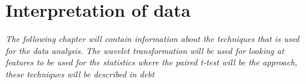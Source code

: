 \chapter{Interpretation of data}
\textit{The following chapter will contain information about the techniques that is used for the data analysis. The wavelet transformation will be used for looking at features to be used for the statistics where the paired t-test will be the approach, these techniques will be described in debt}